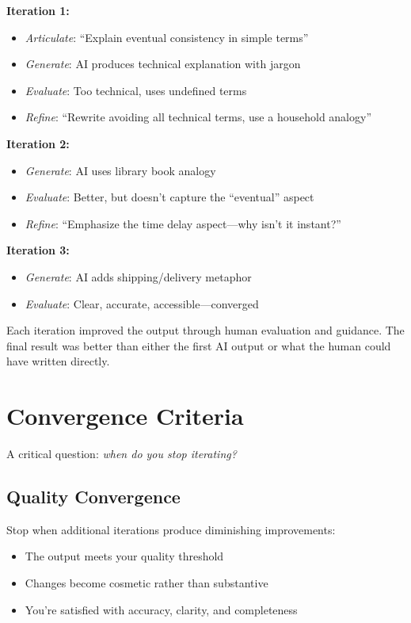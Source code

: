 \textbf{Iteration 1:}
\begin{itemize}
    \item \emph{Articulate}: ``Explain eventual consistency in simple terms''
    \item \emph{Generate}: AI produces technical explanation with jargon
    \item \emph{Evaluate}: Too technical, uses undefined terms
    \item \emph{Refine}: ``Rewrite avoiding all technical terms, use a household analogy''
\end{itemize}

\textbf{Iteration 2:}
\begin{itemize}
    \item \emph{Generate}: AI uses library book analogy
    \item \emph{Evaluate}: Better, but doesn't capture the ``eventual'' aspect
    \item \emph{Refine}: ``Emphasize the time delay aspect---why isn't it instant?''
\end{itemize}

\textbf{Iteration 3:}
\begin{itemize}
    \item \emph{Generate}: AI adds shipping/delivery metaphor
    \item \emph{Evaluate}: Clear, accurate, accessible---converged
\end{itemize}

Each iteration improved the output through human evaluation and guidance. The final result was better than either the first AI output or what the human could have written directly.

\section{Convergence Criteria}

A critical question: \emph{when do you stop iterating?}

\subsection{Quality Convergence}

Stop when additional iterations produce diminishing improvements:

\begin{itemize}
    \item The output meets your quality threshold
    \item Changes become cosmetic rather than substantive
    \item You're satisfied with accuracy, clarity, and completeness
\end{itemize}

